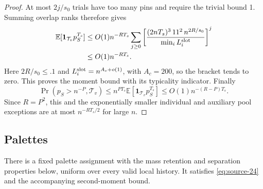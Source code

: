 \begin{proof}
At most \(2j/s_0\) trials have too many pins and require the trivial
bound 1. Summing overlap ranks therefore gives
\[
 \begin{aligned}
 \mathbb E[\mathbf1_{\mathcal T_v}p_S^{T_s}]
 &\le O(1)n^{-RT_s}
    \sum_{j\ge0}
    \left[
      \frac{(2nT_s)^3\,11^2\,n^{2R/s_0}}
           {\min_i L_i^{\rm slot}}
    \right]^j\\
 &\le O(1)n^{-RT_s}.
 \end{aligned}
\]
Here \(2R/s_0\le .1\) and
\(L_i^{\rm slot}=n^{A_c+o(1)}\), with \(A_c=200\), so the bracket
tends to zero. This proves the moment bound with its typicality indicator.
Finally
\[
 \Pr(p_S>n^{-P},\mathcal T_v)
 \le n^{PT_s}\mathbb E[\mathbf1_{\mathcal T_v}p_S^{T_s}]
 \le O(1)n^{-(R-P)T_s}.
\]
Since \(R=P^2\), this and the exponentially smaller individual and
auxiliary pool exceptions are at most \(n^{-RT_s/2}\) for large \(n\).
\end{proof}

\subsection{Palettes}
\label{sec:palettes}

\begin{lemma}\label{lem:low-mode-palettes}
There is a fixed palette assignment with the mass retention and separation
properties below, uniform over every valid local history. It satisfies
\eqref{eq:source-24} and the accompanying second-moment bound.
\end{lemma}

